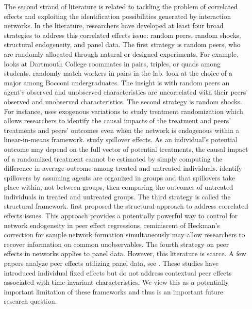 The second strand of literature is related to tackling the problem of correlated effects and exploiting the identification possibilities generated by interaction networks. In the literature, researchers have developed at least four broad strategies to address this correlated effects issue: random peers, random shocks, structural endogeneity, and panel data. The first strategy is random peers, who are randomly allocated through natural or designed experiments. For example, \cite{sacerdote2001peer} looks at Dartmouth College roommates in pairs, triples, or quads among students. \cite{falk2006clean} randomly match workers in pairs in the lab. \cite{de2010identification} look at the choice of a major among Bocconi undergraduates. The insight is with random peers an agent’s observed and unobserved characteristics are uncorrelated with their peers’ observed and unobserved characteristics. The second strategy is random shocks. For instance, \cite{dieye2014accounting} uses exogenous variations to study treatment randomization which allows researchers to identify the causal impacts of the treatment and peers’ treatments and peers’ outcomes even when the network is endogenous within a linear-in-means framework. \cite{miguel2004worms, kremer2007illusion, crepon2013labor} study spillover effects. As an individual’s potential outcome may depend on the full vector of potential treatments, the causal impact of a randomized treatment cannot be estimated by simply computing the difference in average outcome among treated and untreated individuals. \cite{hudgens2008toward, vazquez2022identification} identify spillovers by assuming agents are organized in groups and that spillovers take place within, not between groups, then comparing the outcomes of untreated individuals in treated and untreated groups. The third strategy is called the structural framework. \cite{goldsmith2013social} first proposed the structural approach to address correlated effects issues. This approach provides a potentially powerful way to control for network endogeneity in peer effect regressions, reminiscent of Heckman’s correction for sample network formation simultaneously may allow researchers to recover information on common unobservables. The fourth strategy on peer effects in networks applies to panel data. However, this literature is scarce. A few papers analyze peer effects utilizing panel data, see \cite{patnam2011corporate, comola2021treatment, de2020consumption}. These studies have introduced individual fixed effects but do not address contextual peer effects associated with time-invariant characteristics. We view this as a potentially important limitation of these frameworks and thus is an important future research question.

